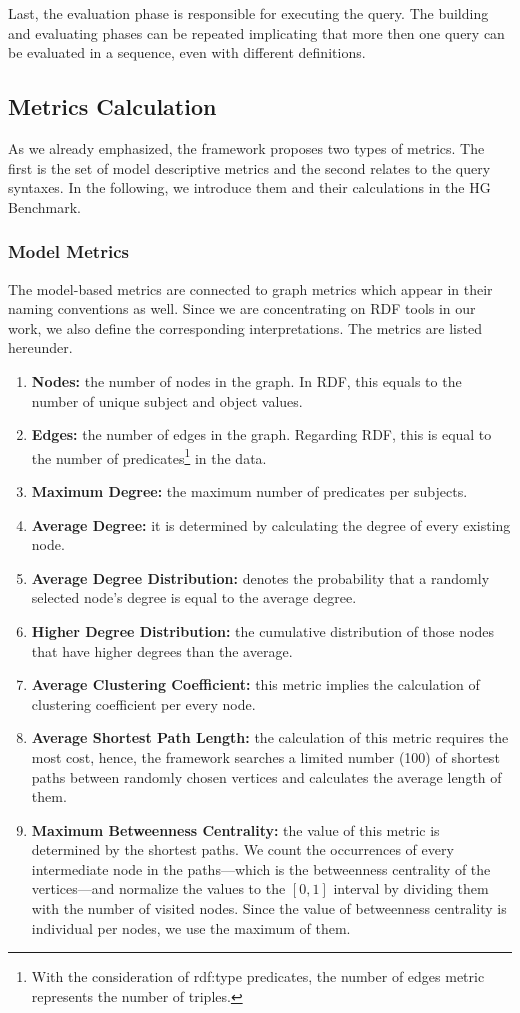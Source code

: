 Last, the evaluation phase is responsible for executing the query. The building and evaluating phases can be repeated implicating that more then one query can be evaluated in a sequence, even with different definitions.

\subsection{Metrics Calculation}
As we already emphasized, the \framework framework proposes two types of metrics. The first is the set of model descriptive metrics and the second relates to the query syntaxes. In the following, we introduce them and their calculations in the HG Benchmark.

\subsubsection{Model Metrics}
The model-based metrics are connected to graph metrics which appear in their naming conventions as well. Since we are concentrating on RDF tools in our work, we also define the corresponding interpretations. The metrics are listed hereunder.
\begin{enumerate}
	\item{\textbf{Nodes:}} the number of nodes in the graph. In RDF, this equals to the number of unique subject and object values.
	\item{\textbf{Edges:}} the number of edges in the graph. Regarding RDF, this is equal to the number of predicates\footnote{With the consideration of \textsf{rdf:type} predicates, the number of edges metric represents the number of triples.} in the data.
	\item{\textbf{Maximum Degree:}} the maximum number of predicates per subjects.
	\item{\textbf{Average Degree:}} it is determined by calculating the degree of every existing node.
	\item{\textbf{Average Degree Distribution:}} denotes the probability that a randomly selected node’s degree is equal to the average degree.
	\item{\textbf{Higher Degree Distribution:}} the cumulative distribution of those nodes that have higher degrees than the average.
	\item{\textbf{Average Clustering Coefficient:}} this metric implies the calculation of clustering coefficient per every node.
	\item{\textbf{Average Shortest Path Length:}} the calculation of this metric requires the most cost, hence, the framework searches a limited number (100) of shortest paths between randomly chosen vertices and calculates the average length of them.
	\item{\textbf{Maximum Betweenness Centrality:}} the value of this metric is determined by the shortest paths. We count the occurrences of every intermediate node in the paths---which is the betweenness centrality of the vertices---and normalize the values to the $[0,1]$ interval by dividing them with the number of visited nodes. Since the value of betweenness centrality is individual per nodes, we use the maximum of them.
\end{enumerate}


